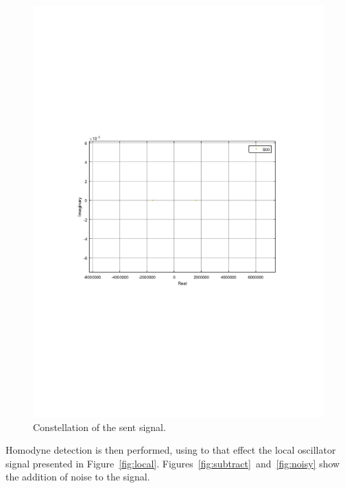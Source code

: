 \documentclass[a4paper]{article}
\begin{document}
\begin{figure}[H]
\centering
\includegraphics[width=\linewidth, trim= 0mm 95mm 0mm 95mm, clip]{constellation.pdf}
\caption{Constellation of the sent signal.}
\label{fig:constellation}
\end{figure}

Homodyne detection is then performed, using to that effect the local oscillator signal presented in Figure~\ref{fig:local}. Figures~\ref{fig:subtract}~and~\ref{fig:noisy} show the addition of noise to the signal.
\end{document}
